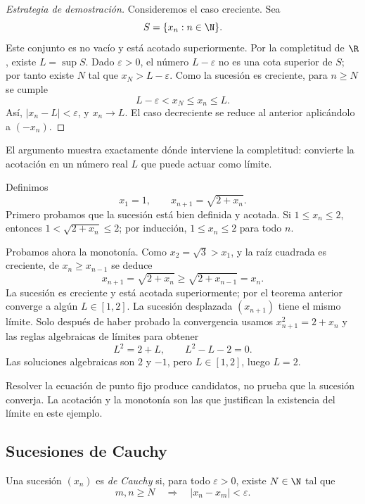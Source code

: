 \begin{proof}[Estrategia de demostración]
Consideremos el caso creciente. Sea
\[
  S=\{x_n:n\in\N\}.
\]
Este conjunto es no vacío y está acotado superiormente. Por la
completitud de \(\R\), existe \(L=\sup S\). Dado \(\varepsilon>0\), el número
\(L-\varepsilon\) no es una cota superior de \(S\); por tanto existe \(N\)
tal que \(x_N>L-\varepsilon\). Como la sucesión es creciente, para \(n\ge N\)
se cumple
\[
  L-\varepsilon<x_N\le x_n\le L.
\]
Así, \(|x_n-L|<\varepsilon\), y \(x_n\to L\). El caso decreciente se reduce
al anterior aplicándolo a \((-x_n)\).
\end{proof}

El argumento muestra exactamente dónde interviene la completitud: convierte
la acotación en un número real \(L\) que puede actuar como límite.

\begin{ejemplo}
Definimos
\[
  x_1=1, \qquad x_{n+1}=\sqrt{2+x_n}.
\]
Primero probamos que la sucesión está bien definida y acotada. Si
\(1\le x_n\le2\), entonces
\(1<\sqrt{2+x_n}\le2\); por inducción, \(1\le x_n\le2\) para todo \(n\).

Probamos ahora la monotonía. Como \(x_2=\sqrt3>x_1\), y la raíz cuadrada es
creciente, de \(x_n\ge x_{n-1}\) se deduce
\[
  x_{n+1}=\sqrt{2+x_n}\ge\sqrt{2+x_{n-1}}=x_n.
\]
La sucesión es creciente y está acotada superiormente; por el teorema anterior
converge a algún \(L\in[1,2]\). La sucesión desplazada \((x_{n+1})\) tiene el
mismo límite. Solo después de haber probado la convergencia usamos
\(x_{n+1}^2=2+x_n\) y las reglas algebraicas de límites para obtener
\[
  L^2=2+L, \qquad L^2-L-2=0.
\]
Las soluciones algebraicas son \(2\) y \(-1\), pero \(L\in[1,2]\), luego
\(L=2\).
\end{ejemplo}

\begin{advertencia}
Resolver la ecuación de punto fijo produce candidatos, no prueba que la
sucesión converja. La acotación y la monotonía son las que justifican la
existencia del límite en este ejemplo.
\end{advertencia}

\subsection{Sucesiones de Cauchy}

\begin{definicion}
Una sucesión \((x_n)\) es \emph{de Cauchy} si, para todo \(\varepsilon>0\),
existe \(N\in\N\) tal que
\[
  m,n\ge N \quad\Longrightarrow\quad |x_n-x_m|<\varepsilon.
\]
\end{definicion}

